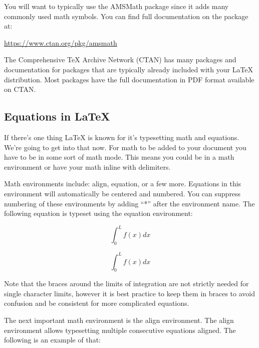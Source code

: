 \begin{center}
\begin{latexcode}
\usepackage{amsmath}
\end{latexcode}
\end{center}
You will want to typically use the AMSMath package since it adds many commonly used math symbols. You can find full documentation on the package at:

\begin{center}
	\url{https://www.ctan.org/pkg/amsmath}
\end{center}

The Comprehensive \TeX{} Archive Network (CTAN) has many packages and documentation for packages that are typically already included with your \LaTeX{} distribution. Most packages have the full documentation in PDF format available on CTAN.


\subsection{Equations in \LaTeX{}}
If there's one thing \LaTeX{} is known for it's typesetting math and equations. We're going to get into that now. For math to be added to your document you have to be in some sort of math mode. This means you could be in a math environment or have your math inline with delimiters. 

Math environments include: align, equation, or a few more. Equations in this environment will automatically be centered and numbered. You can suppress numbering of these environments by adding ``*'' after the environment name. The following equation is typeset using the equation environment:

\begin{equation}
	\int_{0}^{L} f(x) dx
\end{equation}

\begin{center}
\begin{latexcode}
\begin{equation}
\int_{0}^{L} f(x) dx
\end{equation}
\end{latexcode}
\end{center}

Note that the braces around the limits of integration are not strictly needed for single character limits, however it is best practice to keep them in braces to avoid confusion and be consistent for more complicated equations.

The next important math environment is the align environment. The align environment allows typesetting multiple consecutive equations aligned. The following is an example of that:

